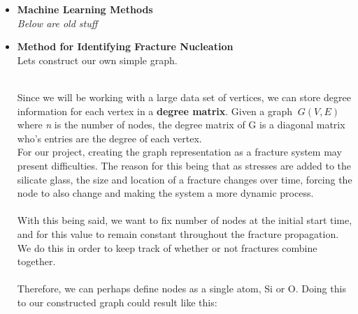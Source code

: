 \begin{itemize}
\\

\item \textbf{Machine Learning Methods}
\bigskip
\\


\textit{Below are old stuff}
\item \textbf{Method for Identifying Fracture Nucleation} 
\bigskip
\\

Lets construct our own simple graph. 
\bigskip
\\
\bigskip
\\

Since we will be working with a large data set of vertices, we can store degree information for each vertex in a \textbf{degree matrix}. Given a graph $\ G(V,E)$ where \textit{n} is the number of nodes, the degree matrix of G is a diagonal matrix who's entries are the degree of each vertex. 
\bigskip
\\


For our project, creating the graph representation as a fracture system may present difficulties. The reason for this being that as stresses are added to the silicate glass, the size and location of a fracture changes over time, forcing the node to also change and making the system a more dynamic process.
\bigskip
\\
\\
With this being said, we want to fix number of nodes at the initial start time, and for this value to remain constant throughout the fracture propagation. We do this in order to keep track of whether or not fractures combine together.
\bigskip
\\
\\
Therefore, we can perhaps define nodes as a single atom, Si or O. Doing this to our constructed graph could result like this:
\bigskip
\\
\end{itemize}
